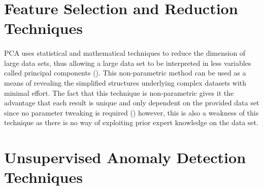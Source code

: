 \section{Feature Selection and Reduction Techniques}


\paragraph{ } \acs{PCA} uses statistical and mathematical techniques to reduce the dimension of large data sets, thus allowing a large data set to be interpreted in less variables called principal components (\cite{Richardson2009}). This non-parametric method can be used as a means of revealing the simplified structures underlying complex datasets with minimal effort. The fact that this technique is non-parametric gives it the advantage that each result is unique and only dependent on the provided data set since no parameter tweaking is required (\cite{Shlens2014}) however, this is also a weakness of this technique as there is no way of exploiting prior expert knowledge on the data set.




\section{Unsupervised Anomaly Detection Techniques}